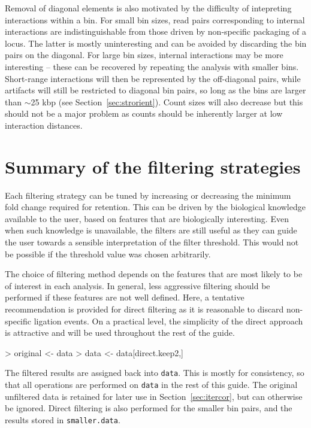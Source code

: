 \documentclass[12pt]{report}
\renewenvironment{Schunk}{\vspace{0pt}}{\vspace{0pt}}
\newcommand{\code}[1]{{\small\texttt{#1}}}
\begin{document}
Removal of diagonal elements is also motivated by the difficulty of intepreting interactions within a bin.
For small bin sizes, read pairs corresponding to internal interactions are indistinguishable from those driven by non-specific packaging of a locus.
The latter is mostly uninteresting and can be avoided by discarding the bin pairs on the diagonal.
For large bin sizes, internal interactions may be more interesting -- these can be recovered by repeating the analysis with smaller bins.
Short-range interactions will then be represented by the off-diagonal pairs, while artifacts will still be restricted to diagonal bin pairs, so long as the bins are larger than $\sim$25 kbp (see Section~\ref{sec:strorient}).
Count sizes will also decrease but this should not be a major problem as counts should be inherently larger at low interaction distances. 

\section{Summary of the filtering strategies}
Each filtering strategy can be tuned by increasing or decreasing the minimum fold change required for retention.
This can be driven by the biological knowledge available to the user, based on features that are biologically interesting.
Even when such knowledge is unavailable, the filters are still useful as they can guide the user towards a sensible interpretation of the filter threshold.
This would not be possible if the threshold value was chosen arbitrarily.

The choice of filtering method depends on the features that are most likely to be of interest in each analysis.
In general, less aggressive filtering should be performed if these features are not well defined.
Here, a tentative recommendation is provided for direct filtering as it is reasonable to discard non-specific ligation events.
On a practical level, the simplicity of the direct approach is attractive and will be used throughout the rest of the guide.

\begin{Schunk}
\begin{Sinput}
> original <- data
> data <- data[direct.keep2,] 
\end{Sinput}
\end{Schunk}

The filtered results are assigned back into \code{data}.
This is mostly for consistency, so that all operations are performed on \code{data} in the rest of this guide.
The original unfiltered data is retained for later use in Section~\ref{sec:itercor}, but can otherwise be ignored.
Direct filtering is also performed for the smaller bin pairs, and the results stored in \code{smaller.data}.
\end{document}
